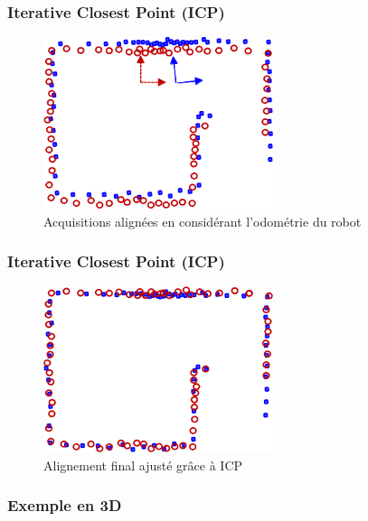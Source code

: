     \begin{frame}
        \frametitle{Iterative Closest Point (ICP)}
            \begin{figure}                 
                \includegraphics[width=0.6\textwidth]{./media/odom_adjusted.png}
                \caption{Acquisitions alignées en considérant l'odométrie du robot}
            \end{figure}
    \end{frame}
    
    \begin{frame}
        \frametitle{Iterative Closest Point (ICP)}
            \begin{figure}                 
                \includegraphics[width=0.6\textwidth]{./media/final.png}
                \caption{Alignement final ajusté grâce à ICP}
            \end{figure}
    \end{frame}
    
    \begin{frame}
    	\frametitle{Exemple en 3D}
    	\centering
    \end{frame}